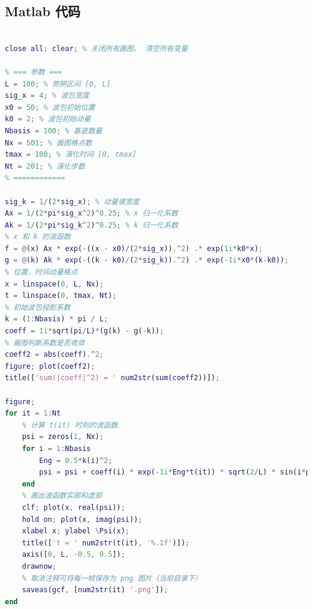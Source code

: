 \subsection{Matlab 代码}

\begin{lstlisting}[language=matlab, caption=WpkISW.m]
% 无限深势阱中的波包

close all; clear; % 关闭所有画图， 清空所有变量

% === 参数 ===
L = 100; % 势阱区间 [0, L]
sig_x = 4; % 波包宽度
x0 = 50; % 波包初始位置
k0 = 2; % 波包初始动量
Nbasis = 100; % 基底数量
Nx = 501; % 画图格点数
tmax = 100; % 演化时间 [0, tmax]
Nt = 201; % 演化步数
% ============

sig_k = 1/(2*sig_x); % 动量谱宽度
Ax = 1/(2*pi*sig_x^2)^0.25; % x 归一化系数
Ak = 1/(2*pi*sig_k^2)^0.25; % k 归一化系数
% x 和 k 的波函数
f = @(x) Ax * exp(-((x - x0)/(2*sig_x)).^2) .* exp(1i*k0*x);
g = @(k) Ak * exp(-((k - k0)/(2*sig_k)).^2) .* exp(-1i*x0*(k-k0));
% 位置，时间动量格点
x = linspace(0, L, Nx);
t = linspace(0, tmax, Nt);
% 初始波包投影系数
k = (1:Nbasis) * pi / L;
coeff = 1i*sqrt(pi/L)*(g(k) - g(-k));
% 画图判断系数是否收敛
coeff2 = abs(coeff).^2;
figure; plot(coeff2);
title(['sum(|coeff|^2) = ' num2str(sum(coeff2))]);

figure;
for it = 1:Nt
    % 计算 t(it) 时刻的波函数
    psi = zeros(1, Nx);
    for i = 1:Nbasis
        Eng = 0.5*k(i)^2;
        psi = psi + coeff(i) * exp(-1i*Eng*t(it)) * sqrt(2/L) * sin(i*pi*x/L);
    end
    % 画出波函数实部和虚部
    clf; plot(x, real(psi));
    hold on; plot(x, imag(psi));
    xlabel x; ylabel \Psi(x);
    title(['t = ' num2str(t(it), '%.1f')]);
    axis([0, L, -0.5, 0.5]);
    drawnow;
    % 取消注释可将每一帧保存为 png 图片（当前目录下）
    saveas(gcf, [num2str(it) '.png']);
end
\end{lstlisting}
